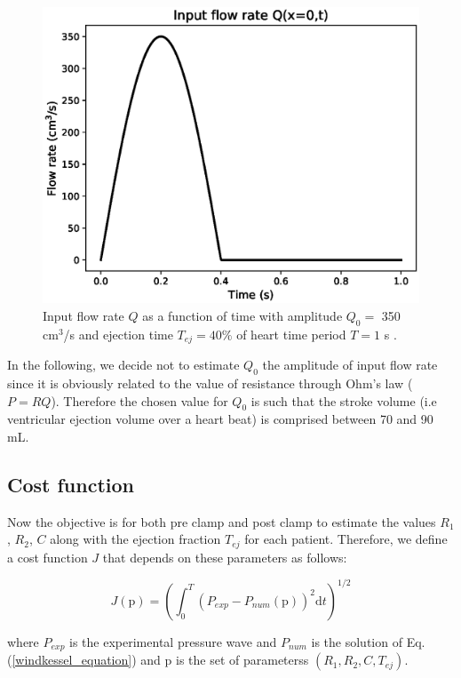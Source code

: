 \documentclass{config}
\begin{document}
\begin{figure}[H]
\centering
\includegraphics[scale=0.6]{Figures/input_flow.eps}
\caption{Input flow rate $Q$ as a function of time with amplitude $Q_0 =$ 350 cm$^3$/s and ejection time $T_{ej} = 40 \%$ of heart time period $T = 1$ s .}
\label{input_flow_rate}
\end{figure}

In the following, we decide not to estimate $Q_0$ the amplitude of input flow rate since it is obviously related to the value of resistance through Ohm's law ($P = R Q$). Therefore the chosen value for $Q_0$ is such that the stroke volume (i.e ventricular ejection volume over a heart beat) is comprised between 70 and 90 mL. 

\subsection{Cost function}

Now the objective is for both pre clamp and post clamp to estimate the values $R_1$, $R_2$,  $C$ along with the ejection fraction $T_{ej}$ for each patient. Therefore, we define a cost function $J$ that depends on these parameters as follows:

\begin{equation}
J(\mathrm{p}) =\left( \int_0^T (P_{exp} - P_{num}(\mathrm{p})) ^2 \mathrm{d}t \right)^{1/2}
\end{equation}

where $P_{exp}$ is the experimental pressure wave and $P_{num}$ is the solution of Eq. (\ref{windkessel_equation}) and $\mathrm{p}$ is the set of parameterss $(R_1, R_2, C,T_{ej}) $. \\ 
\end{document}
